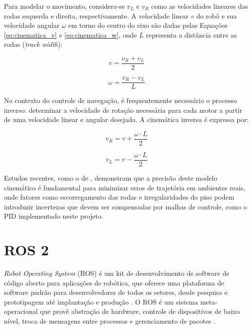 Para modelar o movimento, considera-se $v_L$ e $v_R$ como as velocidades lineares das rodas esquerda e direita, respectivamente. A velocidade linear $v$ do robô e sua velocidade angular $\omega$ em torno do centro do eixo são dadas pelas Equações \ref{eq:cinematica_v} e \ref{eq:cinematica_w}, onde $L$ representa a distância entre as rodas (\textit{track width}):

\begin{equation}
    v = \frac{v_R + v_L}{2}
    \label{eq:cinematica_v}
\end{equation}

\begin{equation}
    \omega = \frac{v_R - v_L}{L}
    \label{eq:cinematica_w}
\end{equation}

No contexto do controle de navegação, é frequentemente necessário o processo inverso: determinar a velocidade de rotação necessária para cada motor a partir de uma velocidade linear e angular desejada. A cinemática inversa é expressa por:

\begin{equation}
    v_R = v + \frac{\omega \cdot L}{2}
    \label{eq:inversa_vr}
\end{equation}

\begin{equation}
    v_L = v - \frac{\omega \cdot L}{2}
    \label{eq:inversa_vl}
\end{equation}

Estudos recentes, como o de , demonstram que a precisão deste modelo cinemático é fundamental para minimizar erros de trajetória em ambientes reais, onde fatores como escorregamento das rodas e irregularidades do piso podem introduzir incertezas que devem ser compensadas por malhas de controle, como o PID implementado neste projeto.


\section{ROS 2}

\textit{Robot Operating System} (ROS) é um kit de desenvolvimento de software de código aberto para aplicações de robótica, que oferece uma plataforma de software padrão para desenvolvedores de todos os setores, desde pesquisa e prototipagem até implantação e produção \cite{ROS.org}. O ROS é um sistema meta-operacional que provê abstração de hardware, controle de dispositivos de baixo nível, troca de mensagens entre processos e gerenciamento de pacotes \cite{macenski2022robot}.

